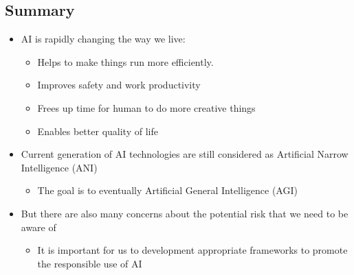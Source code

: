 \documentclass[11pt]{article}
\begin{document}
\clearpage
\subsection{Summary}
\label{sec:orgdba962b}
\begin{itemize}
\item AI is rapidly changing the way we live:
\begin{itemize}
\item Helps to make things run more efficiently.
\item Improves safety and work productivity
\item Frees up time for human to do more creative things
\item Enables better quality of life
\end{itemize}
\item Current generation of AI technologies are still considered as Artificial Narrow Intelligence (ANI)
\begin{itemize}
\item The goal is to eventually Artificial General Intelligence (AGI)
\end{itemize}
\item But there are also many concerns about the potential risk that we need to be aware of
\begin{itemize}
\item It is important for us to development appropriate frameworks to promote the responsible use of AI
\end{itemize}
\end{itemize}
\end{document}
